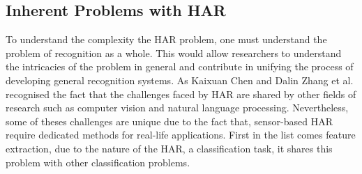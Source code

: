 \subsection{Inherent Problems with HAR}\label{subsec:probHAR}
To understand the complexity the HAR problem, one must understand the problem of recognition as a whole. This would allow researchers to understand the intricacies of the problem in general and contribute in unifying the process of developing general recognition systems. As Kaixuan Chen and Dalin Zhang et al. recognised the fact that the challenges faced by HAR are shared by other fields of research such as computer vision and natural language processing\cite{chen2021deep}. Nevertheless, some of theses challenges are unique due to the fact that, sensor-based HAR require dedicated methods for real-life applications.\newline
First in the list comes feature extraction, due to the nature of the HAR, a classification task, it shares this problem with other classification problems. %
